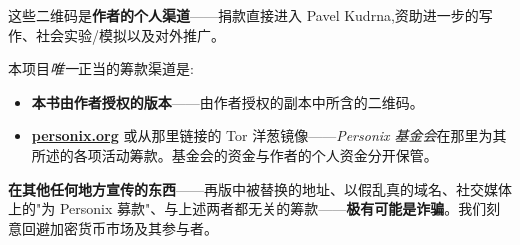 \begin{minipage}[t]{0.60\textwidth}
\vspace{0pt}
\begin{mdframed}[
  linewidth=0.7pt,roundcorner=5pt,
  innerleftmargin=10pt,innerrightmargin=10pt,
  innertopmargin=8pt,innerbottommargin=8pt,
  skipabove=0pt,skipbelow=0pt,
  linecolor=cbwarning!50,backgroundcolor=cbwarning!5,
  nobreak=true,
  needspace=4\baselineskip,
]
\footnotesize
这些二维码是\textbf{作者的个人渠道}——捐款直接进入 Pavel Kudrna,资助进一步的写作、社会实验/模拟以及对外推广。

\smallskip
本项目\emph{唯一}正当的筹款渠道是:

\smallskip
\begin{itemize}
\setlength{\itemsep}{0pt}
\setlength{\topsep}{0pt}
\item \textbf{本书由作者授权的版本}——由作者授权的副本中所含的二维码。
\item \href{https://personix.org}{\textbf{personix.org}} 或从那里链接的 Tor 洋葱镜像——\emph{Personix 基金会}在那里为其所述的各项活动筹款。基金会的资金与作者的个人资金分开保管。
\end{itemize}

\smallskip
\textbf{在其他任何地方宣传的东西}——再版中被替换的地址、以假乱真的域名、社交媒体上的"为 Personix 募款"、与上述两者都无关的筹款——\textbf{极有可能是诈骗}。我们刻意回避加密货币市场及其参与者。
\end{mdframed}
\end{minipage}

\clearpage
